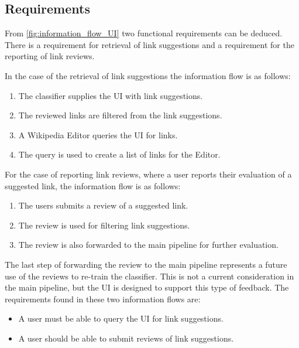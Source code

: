 \subsection{Requirements}\label{sec:uireqs}

From \cref{fig:information_flow_UI} two functional requirements can be deduced. There is a requirement for retrieval of link suggestions and a requirement for the reporting of link reviews.

In the case of the retrieval of link suggestions the information flow is as follows:

\begin{enumerate}
	\item The classifier supplies the UI with link suggestions.
	\item The reviewed links are filtered from the link suggestions.
	\item A Wikipedia Editor queries the UI for links.
	\item The query is used to create a list of links for the Editor.
\end{enumerate}

For the case of reporting link reviews, where a user reports their evaluation of a suggested link, the information flow is as follows:

\begin{enumerate}
	\item The users submits a review of a suggested link.
	\item The review is used for filtering link suggestions.
	\item The review is also forwarded to the main pipeline for further evaluation.
\end{enumerate}

The last step of forwarding the review to the main pipeline represents a future use of the reviews to re-train the classifier. This is not a current consideration in the main pipeline, but the UI is designed to support this type of feedback. The requirements found in these two information flows are:

\begin{itemize}
	\item A user must be able to query the UI for link suggestions.
	\item A user should be able to submit reviews of link suggestions.
\end{itemize}

